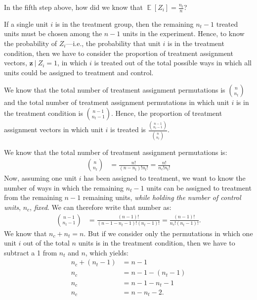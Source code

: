 \documentclass[11pt]{article}\usepackage[]{graphicx}\usepackage[]{color}
\theoremstyle{newstyle}
\newcommand\given[1][]{\:#1\vert\:}
\DeclareMathOperator{\E}{\mathbb{E}}
\begin{document}
In the fifth step above, how did we know that $\E\left[Z_i\right] = \frac{n_t}{n}$?

If a single unit $i$ is in the treatment group, then the remaining $n_t - 1$ treated units must be chosen among the $n - 1$ units in the experiment. Hence, to know the probability of $Z_i$---i.e., the probability that unit $i$ is in the treatment condition, then we have to consider the proportion of treatment assignment vectors, $\mathbf{z} \given Z_i = 1$, in which $i$ is treated out of the total possible ways in which all units could be assigned to treatment and control.

We know that the total number of treatment assignment permutations is ${n \choose n_t}$ and the total number of treatment assignment permutations in which unit $i$ is in the treatment condition is ${n - 1 \choose n_t - 1}$. Hence, the proportion of treatment assignment vectors in which unit $i$ is treated is $\frac{{n - 1 \choose n_t - 1}}{{n \choose n_t}}$.

We know that the total number of treatment assignment permutations is:
\begin{align*}
{n \choose n_t} & = \frac{n!}{\left(n - n_t\right)!n_t!} = \frac{n!}{n_c!n_t!}
\end{align*}
Now, assuming one unit $i$ has been assigned to treatment, we want to know the number of ways in which the remaining $n_t - 1$ units can be assigned to treatment from the remaining $n - 1$ remaining units, \textit{while holding the number of control units}, $n_c$, \textit{fixed}. We can therefore write that number as:
\begin{align*}
{n - 1 \choose n_t - 1} & = \frac{\left(n - 1\right)!}{\left(n - 1 - n_t - 1\right)!\left(n_t - 1\right)!} = \frac{\left(n - 1\right)!}{n_c!\left(n_t - 1\right)!}.
\end{align*}
We know that $n_c + n_t = n$. But if we consider only the permutations in which one unit $i$ out of the total $n$ units is in the treatment condition, then we have to subtract a 1 from $n_t$ and $n$, which yields:
\begin{align*}
n_c + \left(n_t - 1\right) & = n - 1 \\
n_c  & = n - 1 - \left(n_t - 1\right) \\
n_c & = n - 1 - n_t - 1 \\
n_c & = n - n_t - 2.
\end{align*}
\end{document}
